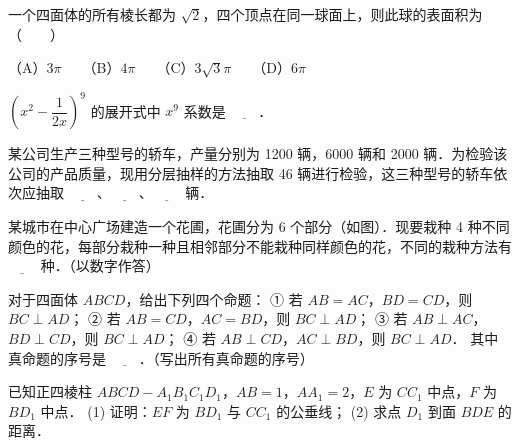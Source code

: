 \begin{question}
一个四面体的所有棱长都为 $\sqrt{2}$，四个顶点在同一球面上，则此球的表面积为\mbox{（　　）}

（A）$3\pi$　　（B）$4\pi$　　（C）$3\sqrt{3}\pi$　　（D）$6\pi$

\end{question}
\begin{question}
$\left(x^2 - \dfrac{1}{2x}\right)^9$ 的展开式中 $x^9$ 系数是 $\underline{\hspace{2em}}$．

\end{question}
\begin{question}
某公司生产三种型号的轿车，产量分别为 1200 辆，6000 辆和 2000 辆．为检验该公司的产品质量，现用分层抽样的方法抽取 46 辆进行检验，这三种型号的轿车依次应抽取 $\underline{\hspace{2em}}$、$\underline{\hspace{2em}}$、$\underline{\hspace{2em}}$ 辆．

\Needspace{0.4\textheight}
\end{question}
\begin{question}
某城市在中心广场建造一个花圃，花圃分为 6 个部分（如图）．现要栽种 4 种不同颜色的花，每部分栽种一种且相邻部分不能栽种同样颜色的花，不同的栽种方法有 $\underline{\hspace{2em}}$ 种．（以数字作答）
\nopagebreak[4]
\begin{center}\end{center}
\nopagebreak[4]
\end{question}
\begin{question}
对于四面体 $ABCD$，给出下列四个命题：
① 若 $AB = AC$，$BD = CD$，则 $BC \perp AD$；
② 若 $AB = CD$，$AC = BD$，则 $BC \perp AD$；
③ 若 $AB \perp AC$，$BD \perp CD$，则 $BC \perp AD$；
④ 若 $AB \perp CD$，$AC \perp BD$，则 $BC \perp AD$．
其中真命题的序号是 $\underline{\hspace{2em}}$．（写出所有真命题的序号）

\Needspace{0.4\textheight}
\end{question}
\begin{question}
已知正四棱柱 $ABCD - A_1B_1C_1D_1$，$AB = 1$，$AA_1 = 2$，$E$ 为 $CC_1$ 中点，$F$ 为 $BD_1$ 中点．
(1) 证明：$EF$ 为 $BD_1$ 与 $CC_1$ 的公垂线；
(2) 求点 $D_1$ 到面 $BDE$ 的距离．
\nopagebreak[4]
\begin{center}\end{center}
\nopagebreak[4]
\end{question}
